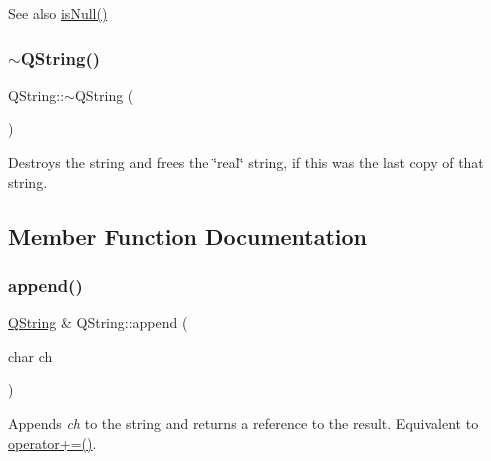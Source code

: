 \begin{DoxySeeAlso}{See also}
\mbox{\hyperlink{class_q_string_a6a6da156364a32ef91e35f83b1955acc}{is\+Null()}} 
\end{DoxySeeAlso}
\mbox{\label{class_q_string_afa89b9f5bbd0f59d390ddfae4972c34e}} 
\subsubsection{\texorpdfstring{$\sim$QString()}{~QString()}}
{\footnotesize\ttfamily Q\+String\+::$\sim$\+Q\+String (\begin{DoxyParamCaption}{ }\end{DoxyParamCaption})\hspace{0.3cm}{\ttfamily [inline]}}

Destroys the string and frees the \char`\"{}real\char`\"{} string, if this was the last copy of that string. 

\subsection{Member Function Documentation}
\mbox{\label{class_q_string_a5e251de7eb95440be1fed6e0afef0638}} 
\subsubsection{\texorpdfstring{append()}{append()}\hspace{0.1cm}{\footnotesize\ttfamily [1/3]}}
{\footnotesize\ttfamily \mbox{\hyperlink{class_q_string}{Q\+String}} \& Q\+String\+::append (\begin{DoxyParamCaption}\item[{char}]{ch }\end{DoxyParamCaption})\hspace{0.3cm}{\ttfamily [inline]}}

Appends {\itshape ch} to the string and returns a reference to the result. Equivalent to \mbox{\hyperlink{class_q_string_a01ef0a41636e87e459fc42f2bb2c0a70}{operator+=()}}. \mbox{\label{class_q_string_a212b80401444eb3f67321fb55ddf64d5}} 
